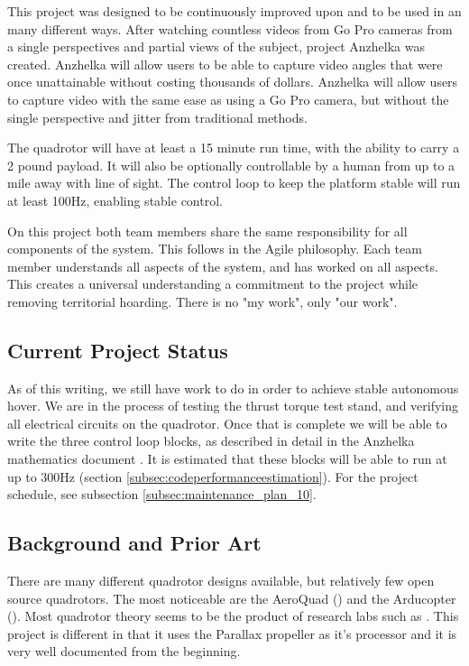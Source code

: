 \documentclass{article}
\numberwithin{equation}{section} %
\begin{document}
This project was designed to be continuously improved upon and to be used in an many different ways. After watching countless videos from Go Pro cameras from a single perspectives and partial views of the subject, project Anzhelka was created. Anzhelka will allow users to be able to capture video angles that were once unattainable without costing thousands of dollars. Anzhelka will allow users to capture video with the same ease as using a Go Pro camera, but without the single perspective and jitter from traditional methods.

The quadrotor will have at least a 15 minute run time, with the ability to carry a 2 pound payload. It will also be optionally controllable by a human from up to a mile away with line of sight. The control loop to keep the platform stable will run at least 100Hz, enabling stable control.

On this project both team members share the same responsibility for all components of the system. This follows in the Agile philosophy. Each team member understands all aspects of the system, and has worked on all aspects. This creates a universal understanding a commitment to the project while removing territorial hoarding. There is no "my work", only "our work".

\subsection{Current Project Status}
As of this writing, we still have work to do in order to achieve stable autonomous hover. We are in the process of testing the thrust torque test stand, and verifying all electrical circuits on the quadrotor. Once that is complete we will be able to write the three control loop blocks, as described in detail in the Anzhelka mathematics document \cite{anzhelka_math}. It is estimated that these blocks will be able to run at up to 300Hz (section \ref{subsec:codeperformanceestimation}).  For the project schedule, see subsection \ref{subsec:maintenance_plan_10}.

\subsection{Background and Prior Art}
There are many different quadrotor designs available, but relatively few open source quadrotors. The most noticeable are the AeroQuad (\cite{aeroquad}) and the Arducopter (\cite{arducopter}). Most quadrotor theory seems to be the product of research labs such as \cite{stingu09}. This project is different in that it uses the Parallax propeller as it's processor and it is very well documented from the beginning.
\end{document}
